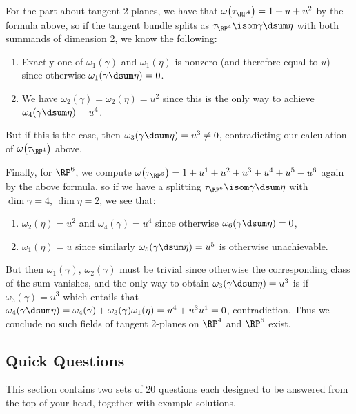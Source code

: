 \begin{solution}
	For the part about tangent 2-planes, we have that $\omega\big(\tau_{\RP^4}\big) = 1 + u + u^2$ by the formula above, so if the tangent bundle splits as $\tau_{\RP^4} \isom \gamma \dsum \eta$ with both summands of dimension 2, we know the following:
	\begin{enumerate}
		\item Exactly one of $\omega_1(\gamma)$ and $\omega_1(\eta)$ is nonzero (and therefore equal to $u$) since otherwise $\omega_1(\gamma \dsum \eta) = 0$.
		\item We have $\omega_2(\gamma) = \omega_2(\eta) = u^2$ since this is the only way to achieve $\omega_4(\gamma \dsum \eta) = u^4$.
	\end{enumerate}
	But if this is the case, then $\omega_3(\gamma \dsum \eta) = u^3 \neq 0$, contradicting our calculation of $\omega\big(\tau_{\RP^4}\big)$ above.

	Finally, for $\RP^6$, we compute $\omega\big(\tau_{\RP^6}\big) = 1 + u^1 + u^2 + u^3 + u^4 + u^5 + u^6$ again by the above formula, so if we have a splitting $\tau_{\RP^6} \isom \gamma \dsum \eta$ with $\dim \gamma = 4$, $\dim \eta = 2$, we see that:
	\begin{enumerate}
		\item $\omega_2(\eta) = u^2$ and $\omega_4(\gamma) = u^4$ since otherwise $\omega_6(\gamma \dsum \eta) = 0$,
		\item $\omega_1(\eta) = u$ since similarly $\omega_5(\gamma \dsum \eta) = u^5$ is otherwise unachievable.
	\end{enumerate}
	But then $\omega_1(\gamma)$, $\omega_2(\gamma)$ must be trivial since otherwise the corresponding class of the sum vanishes, and the only way to obtain $\omega_3(\gamma \dsum \eta) = u^3$ is if $\omega_3(\gamma) = u^3$ which entails that $\omega_4(\gamma \dsum \eta) = \omega_4(\gamma) + \omega_3(\gamma) \omega_1(\eta) = u^4 + u^3 u^1 = 0$, contradiction.
	Thus we conclude no such fields of tangent 2-planes on $\RP^4$ and $\RP^6$ exist.
\end{solution}

\subsection{Quick Questions}\label{sect:quickquest}
This section contains two sets of 20 questions each designed to be answered from the top of your head, together with example solutions.

